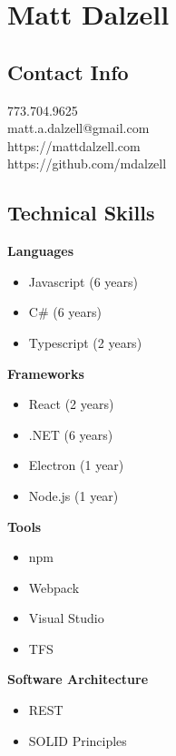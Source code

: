 \documentclass[12pt]{article}
\begin{document}

\section*{Matt Dalzell}

\setlength{\columnsep}{4em}
\setlength{\columnseprule}{0.1pt}
\begin{paracol}{2}

\subsection*{Contact Info}
773.704.9625 \\
matt.a.dalzell@gmail.com \\ 
https://mattdalzell.com \\
https://github.com/mdalzell

\subsection*{Technical Skills} 

\textbf{Languages}
\begin{itemize}
    \item Javascript {\footnotesize{(6 years)}}
    \item C\# {\footnotesize{(6 years)}}
    \item Typescript {\footnotesize{(2 years)}}
\end{itemize} 

\noindent \textbf{Frameworks}
\begin{itemize}
    \item React {\footnotesize{(2 years)}}
    \item .NET {\footnotesize{(6 years)}}
    \item Electron {\footnotesize{(1 year)}}
    \item Node.js {\footnotesize{(1 year)}}
\end{itemize}

\noindent \textbf{Tools}
\begin{itemize}
    \item npm
    \item Webpack
    \item Visual Studio
    \item TFS
\end{itemize}

\noindent \textbf{Software Architecture}
\begin{itemize}
    \item REST
    \item SOLID Principles
\end{itemize}


\end{paracol}
\end{document}
